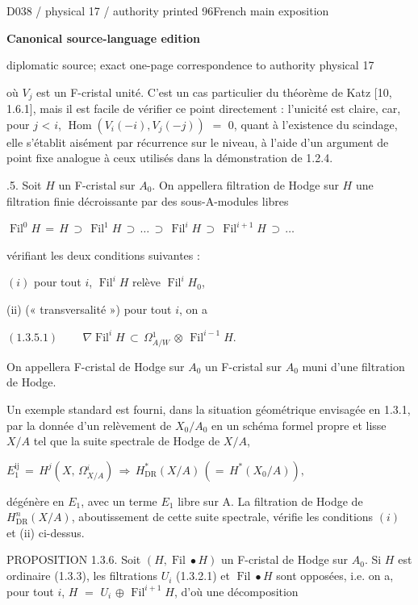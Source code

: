 \documentclass[9pt]{article}
\newcommand{\CanonText}[1]{\par{\fontsize{8.0}{9.35}\selectfont\RaggedRight #1\par}\vspace{2.2pt}}
\newcommand{\CanonDisplay}[1]{\par\vspace{1.2pt}\begin{center}{\fontsize{7.2}{8.4}\selectfont\(\displaystyle #1\)}\end{center}\vspace{1.2pt}}
\newcommand{\LayerTitle}{Canonical source-language edition}
\begin{document}
\noindent\begin{minipage}[t][\dimexpr\textheight-5pt\relax][t]{\textwidth}
{\sffamily\fontsize{7.3}{8.2}\selectfont\color{Quiet} D038 / physical 17 / authority printed 96\hfill French main exposition}
\par{}\vspace{4.5pt}
{\sffamily\fontsize{10.4}{11.6}\selectfont\bfseries\color{Accent} \LayerTitle}
\par{\sffamily\fontsize{6.7}{7.7}\selectfont\color{Quiet} diplomatic source; exact one-page correspondence to authority physical 17}
\vspace{5pt}
\CanonText{où \(V_{j}\) est un F-cristal unité. C'est un cas particulier du théorème de Katz [10, 1.6.1], mais il est facile de vérifier ce point directement : l'unicité est claire, car, pour \(j\) < \(i\), \(\operatorname{Hom}(V_{i}(-i),V_{j}(-j))\) \(=\) 0, quant à l'existence du scindage, elle s'établit aisément par récurrence sur le niveau, à l'aide d'un argument de point fixe analogue à ceux utilisés dans la démonstration de 1.2.4.}
\CanonText{1.3.5. Soit \(H\) un F-cristal sur \(A_{0}\). On appellera filtration de Hodge sur \(H\) une filtration finie décroissante par des sous-A-modules libres}
\CanonDisplay{\operatorname{Fil}^{0}H\,=\,H\,\supset{}\,\operatorname{Fil}^{1}H\,\supset{}\,\ldots{}\,\supset{}\,\operatorname{Fil}^{i}H\,\supset{}\,\operatorname{Fil}^{i+1}H\,\supset{}\,\ldots{}}
\CanonText{vérifiant les deux conditions suivantes :}
\CanonText{\((i)\) pour tout \(i\), \(\operatorname{Fil}^{i}H\) relève \(\operatorname{Fil}^{i}H_{0}\),}
\CanonText{(ii) (« transversalité ») pour tout \(i\), on a}
\CanonDisplay{(1.3.5.1)\qquad\,\nabla{}\operatorname{Fil}^{i}H\,\subset{}\,\Omega{}^{1}_{A/W}\,\otimes{}\,\operatorname{Fil}^{i-1}H.}
\CanonText{On appellera F-cristal de Hodge sur \(A_{0}\) un F-cristal sur \(A_{0}\) muni d'une filtration de Hodge.}
\CanonText{Un exemple standard est fourni, dans la situation géométrique envisagée en 1.3.1, par la donnée d'un relèvement de \(X_{0}/A_{0}\) en un schéma formel propre et lisse \(X/A\) tel que la suite spectrale de Hodge de \(X/A\),}
\CanonDisplay{E_{1}^{\mathrm{ij}}\,=\,H^{j}(X,\,\Omega{}^{i}_{X/A})\,\Rightarrow{}\,H^{*}_{\mathrm{DR}}(X/A)\,(=\,H^{*}(X_{0}/A)),}
\CanonText{dégénère en \(E_{1}\), avec un terme \(E_{1}\) libre sur A. La filtration de Hodge de \(H^{n}_{\mathrm{DR}}(X/A)\), aboutissement de cette suite spectrale, vérifie les conditions \((i)\) et (ii) ci-dessus.}
\CanonText{PROPOSITION 1.3.6. Soit \((H,\operatorname{Fil}\bullet{}H)\) un F-cristal de Hodge sur \(A_{0}\). Si \(H\) est ordinaire (1.3.3), les filtrations \(U_{i}\) (1.3.2.1) et \(\operatorname{Fil}\bullet{}H\) sont opposées, i.e. on a, pour tout \(i\), \(H\) \(=\) \(U_{i}\) \(\oplus{}\) \(\operatorname{Fil}^{i+1}H\), d'où une décomposition}

\end{minipage}
\end{document}
